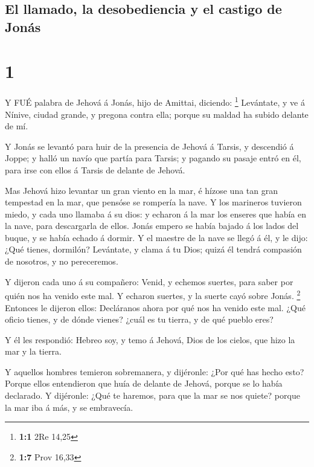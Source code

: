 \hypertarget{el-llamado-la-desobediencia-y-el-castigo-de-jonuxe1s}{%
\subsection{El llamado, la desobediencia y el castigo de
Jonás}\label{el-llamado-la-desobediencia-y-el-castigo-de-jonuxe1s}}

\hypertarget{section}{%
\section{1}\label{section}}

 Y FUÉ palabra de Jehová á Jonás, hijo de Amittai, diciendo:
\footnote{\textbf{1:1} 2Re 14,25}  Levántate, y ve á Nínive,
ciudad grande, y pregona contra ella; porque su maldad ha subido delante
de mí.

 Y Jonás se levantó para huir de la presencia de Jehová á
Tarsis, y descendió á Joppe; y halló un navío que partía para Tarsis; y
pagando su pasaje entró en él, para irse con ellos á Tarsis de delante
de Jehová.

 Mas Jehová hizo levantar un gran viento en la mar, é hízose
una tan gran tempestad en la mar, que pensóse se rompería la nave.
 Y los marineros tuvieron miedo, y cada uno llamaba á su
dios: y echaron á la mar los enseres que había en la nave, para
descargarla de ellos. Jonás empero se había bajado á los lados del
buque, y se había echado á dormir.  Y el maestre de la nave
se llegó á él, y le dijo: ¿Qué tienes, dormilón? Levántate, y clama á tu
Dios; quizá él tendrá compasión de nosotros, y no pereceremos.

 Y dijeron cada uno á su compañero: Venid, y echemos
suertes, para saber por quién nos ha venido este mal. Y echaron suertes,
y la suerte cayó sobre Jonás. \footnote{\textbf{1:7} Prov 16,33}
 Entonces le dijeron ellos: Decláranos ahora por qué nos ha
venido este mal. ¿Qué oficio tienes, y de dónde vienes? ¿cuál es tu
tierra, y de qué pueblo eres?

 Y él les respondió: Hebreo soy, y temo á Jehová, Dios de
los cielos, que hizo la mar y la tierra.

 Y aquellos hombres temieron sobremanera, y dijéronle: ¿Por
qué has hecho esto? Porque ellos entendieron que huía de delante de
Jehová, porque se lo había declarado.  Y dijéronle: ¿Qué te
haremos, para que la mar se nos quiete? porque la mar iba á más, y se
embravecía.

